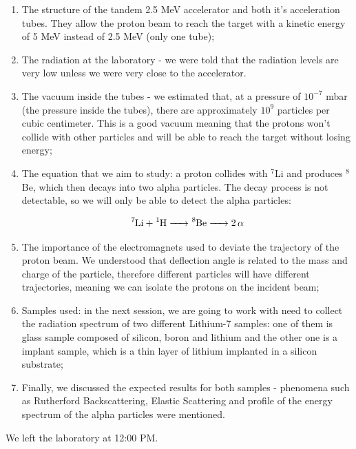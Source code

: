 \documentclass{article}
\begin{document}
\begin{enumerate}
  \item The structure of the tandem 2.5 MeV accelerator and both it's acceleration tubes. They allow the proton beam to reach the target with a kinetic energy of 5 MeV instead of 2.5 MeV (only one tube);
  \item The radiation at the laboratory - we were told that the radiation levels are very low unless we were very close to the accelerator.
  \item The vacuum inside the tubes - we estimated that, at a pressure of $10^{-7}$ mbar (the pressure inside the tubes), there are approximately $10^9$ particles per cubic centimeter. This is a good vacuum meaning that the protons won't collide with other particles and will be able to reach the target without losing energy;
  \item The equation that we aim to study: a proton collides with $^7$Li and produces $^8$Be, which then decays into two alpha particles. The decay process is not detectable, so we will only be able to detect the alpha particles:
  
  \begin{equation}
    \ce{^7Li + ^1H -> ^8Be -> 2\alpha}
  \end{equation}
  
  \item The importance of the electromagnets used to deviate the trajectory of the proton beam. We understood that deflection angle is related to the mass and charge of the particle, therefore different particles will have different trajectories, meaning we can isolate the protons on the incident beam;
  \item Samples used: in the next session, we are going to work with need to collect the radiation spectrum of two different Lithium-7 samples: one of them is glass sample composed of silicon, boron and lithium and the other one is a implant sample, which is a thin layer of lithium implanted in a silicon substrate;
  \item Finally, we discussed the expected results for both samples - phenomena such as Rutherford Backscattering, Elastic Scattering and profile of the energy spectrum of the alpha particles were mentioned.
\end{enumerate}

We left the laboratory at 12:00 PM.

\end{document}
